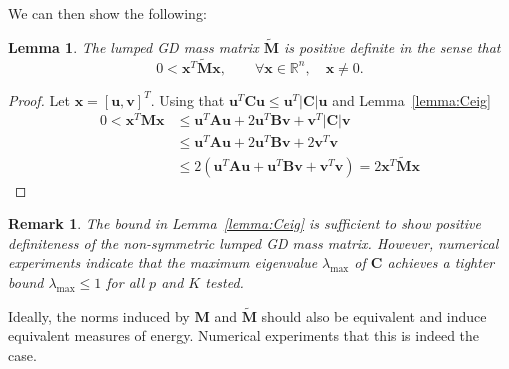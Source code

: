 \documentclass[preprint,10pt]{amsart}
\theoremstyle{lemma}
\newtheorem{lemma}{Lemma}
\theoremstyle{corollary}
\newtheorem*{remark}{Remark}
\theoremstyle{theorem}
\renewcommand{\tilde}{\widetilde}
\newcommand{\LRp}[1]{\left( #1 \right)}
\newcommand{\LRs}[1]{\left[ #1 \right]}
\newcommand{\LRb}[1]{\left| #1 \right|}
\begin{document}
We can then show the following:
\begin{lemma}
The lumped GD mass matrix $\tilde{\bm{M}}$ is positive definite in the sense that
\[
0 < \bm{x}^T\tilde{\bm{M}}\bm{x}, \qquad \forall \bm{x}\in \mathbb{R}^n, \quad \bm{x}\neq 0.
\]
\end{lemma}
\begin{proof}
Let $\bm{x} = \LRs{\bm{u},\bm{v}}^T$.  Using that $\bm{u}^T\bm{C}\bm{u} \leq \bm{u}^T\LRb{\bm{C}}\bm{u}$ and Lemma~\ref{lemma:Ceig}
\begin{align*}
0 < \bm{x}^T{\bm{M}}\bm{x}&\leq \bm{u}^T\bm{A}\bm{u} + 2\bm{u}^T\bm{B}\bm{v} + \bm{v}^T\LRb{\bm{C}}\bm{v}\\
&\leq \bm{u}^T\bm{A}\bm{u} + 2\bm{u}^T\bm{B}\bm{v} + 2\bm{v}^T\bm{v}\\
&\leq 2\LRp{\bm{u}^T\bm{A}\bm{u} + \bm{u}^T\bm{B}\bm{v}+ \bm{v}^T\bm{v}} = 2 \bm{x}^T\tilde{\bm{M}}\bm{x}
\end{align*}
\end{proof}

\begin{remark}
The bound in Lemma~\ref{lemma:Ceig} is sufficient to show positive definiteness of the non-symmetric lumped GD mass matrix.  However, numerical experiments indicate that the maximum eigenvalue $\lambda_{\max}$ of $\bm{C}$ achieves a tighter bound $\lambda_{\max} \leq 1$ for all $p$ and $K$ tested.  
\end{remark}


Ideally, the norms induced by $\bm{M}$ and $\tilde{\bm{M}}$ should also be equivalent and induce equivalent measures of energy.  Numerical experiments that this is indeed the case.  

%
\end{document}
